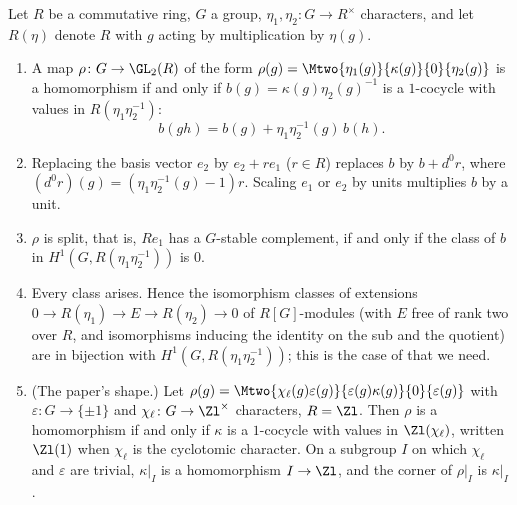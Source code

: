 \begin{proposition}\label{prop:cohomology:corner}
Let $R$ be a commutative ring, $G$ a group, $\eta_1,\eta_2\colon G\to R^\times$ characters, and let $R(\eta)$ denote $R$ with $g$ acting by multiplication by
$\eta(g)$.
\begin{enumerate}[label=(\roman*)]
\item A map $\rho\colon G\to\GL_2(R)$ of the form $\rho(g)=\Mtwo{\eta_1(g)}{\kappa(g)}{0}{\eta_2(g)}$ is a homomorphism if and only if
$b(g)=\kappa(g)\eta_2(g)^{-1}$ is a $1$-cocycle with values in $R(\eta_1\eta_2^{-1})$:
\[
b(gh)=b(g)+\eta_1\eta_2^{-1}(g)\,b(h).
\]
\item Replacing the basis vector $e_2$ by $e_2+re_1$ ($r\in R$) replaces $b$ by $b+d^0r$, where $(d^0r)(g)=(\eta_1\eta_2^{-1}(g)-1)r$. Scaling $e_1$ or
$e_2$ by units multiplies $b$ by a unit.
\item $\rho$ is split, that is, $Re_1$ has a $G$-stable complement, if and only if the class of $b$ in $H^1(G,R(\eta_1\eta_2^{-1}))$ is $0$.
\item Every class arises. Hence the isomorphism classes of extensions $0\to R(\eta_1)\to E\to R(\eta_2)\to0$ of $R[G]$-modules (with $E$ free of rank two over
$R$, and isomorphisms inducing the identity on the sub and the quotient) are in bijection with $H^1(G,R(\eta_1\eta_2^{-1}))$; this is the case of
 that we need.
\item (The paper's shape.) Let $\rho(g)=\Mtwo{\chi_\ell(g)\varepsilon(g)}{\varepsilon(g)\kappa(g)}{0}{\varepsilon(g)}$ with $\varepsilon\colon G\to\{\pm1\}$ and $\chi_\ell\colon G\to\Zl^\times$
characters, $R=\Zl$. Then $\rho$ is a homomorphism if and only if $\kappa$ is a $1$-cocycle with values in $\Zl(\chi_\ell)$, written $\Zl(1)$ when
$\chi_\ell$ is the cyclotomic character. On a subgroup $I$ on which $\chi_\ell$ and $\varepsilon$ are trivial, $\kappa|_I$ is a homomorphism $I\to\Zl$, and
the corner of $\rho|_I$ is $\kappa|_I$.
\end{enumerate}
\end{proposition}

